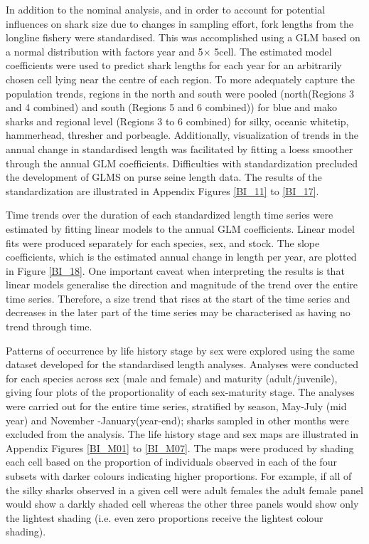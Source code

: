 \documentclass[12pt]{SCreport}
\begin{document}
In addition to the nominal analysis, and in order to account for potential influences on shark size due to changes in sampling effort, fork lengths from the longline fishery were standardised. This was accomplished using a GLM based on a normal distribution with factors year and 5\degree $\times$ 5\degree cell. The estimated model coefficients were used to predict shark lengths for each year for an arbitrarily chosen cell lying near the centre of each region. To more adequately capture the population trends, regions in the north and south were pooled (north(Regions 3 and 4 combined) and south (Regions 5 and 6 combined)) for blue and mako sharks and regional level (Regions 3 to 6 combined) for silky, oceanic whitetip, hammerhead, thresher and porbeagle.  Additionally, visualization of trends in the annual change in standardised length was facilitated by fitting a loess smoother through the annual GLM coefficients.  Difficulties with standardization precluded the development of GLMS on purse seine length data. The results of the standardization are illustrated in Appendix Figures \ref{BI_11} to \ref{BI_17}.

Time trends over the duration of each standardized length time series were estimated by fitting linear models to the annual GLM coefficients.  Linear model fits were produced separately for each species, sex, and stock.   The slope coefficients, which is the estimated annual change in length per year, are plotted in Figure \ref{BI_18}.  One important caveat when interpreting the results is that linear models generalise the direction and magnitude of the trend over the entire time series. Therefore, a size trend that rises at the start of the time series and decreases in the later part of the time series may be characterised as having no trend through time.


Patterns of occurrence by life history stage by sex were explored using the same dataset developed for the standardised length analyses.  Analyses were conducted for each species  across sex (male and female) and maturity (adult/juvenile), giving four plots of the proportionality of each sex-maturity stage.  The analyses were carried out for the entire time series, stratified by season,  May-July (mid year) and November -January(year-end); sharks sampled in other months were excluded from the analysis.  The life history stage and sex maps are illustrated in Appendix Figures \ref{BI_M01} to \ref{BI_M07}.  The maps were produced by shading each cell based on the proportion of individuals observed in each of the four subsets with darker colours indicating higher proportions. For example, if all of the silky sharks observed in a given cell were adult females the adult female panel would show a darkly shaded cell whereas the other three panels would show only the lightest shading (i.e. even zero proportions receive the lightest colour shading). 
\end{document}
